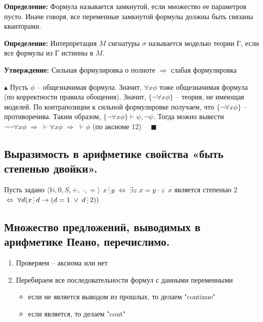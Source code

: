 \textbf{Определение:} Формула называется замкнутой, если множество ее параметров пусто. Иначе говоря, все переменные замкнутой формулы должны быть связаны кванторами.

\textbf{Определение:} Интерпретация $M$ сигнатуры $\sigma$ называется моделью теории Г, если все формулы из Г истинны в $M$.

\textbf{Утверждение:} Сильная формулировка о полноте $\Rightarrow$ слабая формулировка

$\blacktriangle$ Пусть $\phi$ -- общезначимая формула. Значит, $\forall x\phi$ тоже общезначимая формула (по корректности правила обощения). Значит, $\{\neg \forall x\phi\}$ -- теория, не имеющая моделей. По контрапозиции к сильной формулировке получаем, что $\{\neg \forall x\phi\}$ -- противоречива. Таким образом, $\{\neg \forall x\phi\}\vdash \psi,\neg\psi$. Тогда можно вывести $\neg\neg \forall x\phi \; \Rightarrow \;\vdash\forall x \phi \; \Rightarrow \; \vdash \phi$ (по аксиоме 12) $\quad \blacksquare$

\subsection{Выразимость в арифметике свойства «быть степенью двойки».}
Пусть задано $\langle\mathbb{N}, 0, S, +, \; \cdot, =\rangle$
\newline $x \svdots y \; \Leftrightarrow \; \exists z \; x= y \cdot z$
\newline $x$ является степенью 2 $\; \Leftrightarrow \; \forall d(x \svdots d \to (d=1 \;\lor\; d \svdots 2))$

\subsection{Множество предложений, выводимых в арифметике Пеано, перечислимо.}
\begin{enumerate}
    \item Проверяем -- аксиома или нет
    \item Перебираем все последовательности формул с данными переменными
    \begin{itemize}
        \item если не является выводом из прошлых, то делаем "continue"
        \item если является, то делаем "cout"
    \end{itemize}
\end{enumerate}